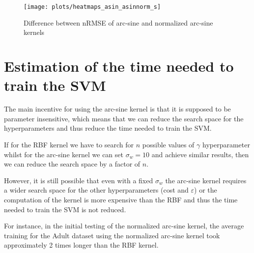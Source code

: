 \begin{figure}[H]
    \texttt{[image: plots/heatmaps\_asin\_asinnorm\_s]}
    \caption{Difference between nRMSE of arc-sine and normalized arc-sine kernels}
    \label{fig:heatmaps-asin-asinnorm}
\end{figure}


%
%
%

\section{Estimation of the time needed to train the SVM}

The main incentive for using the arc-sine kernel is that it is supposed to be
parameter insensitive, which means that we can reduce the search space for the
hyperparameters and thus reduce the time needed to train the SVM.

If for the RBF kernel we have to search for $n$ possible values of $\gamma$
hyperparameter whilst for the arc-sine kernel we can set $\sigma_w=10$ and
achieve similar results, then we can reduce the search space by a factor of $n$.

However, it is still possible that even with a fixed $\sigma_w$ the arc-sine
kernel requires a wider search space for the other hyperparameters (cost and
$\varepsilon$) or the computation of the kernel is more expensive than the RBF
and thus the time needed to train the SVM is not reduced.

For instance, in the initial testing of the normalized arc-sine kernel, the average
training for the Adult dataset using the normalized arc-sine kernel
took approximately 2 times longer than the RBF kernel.

